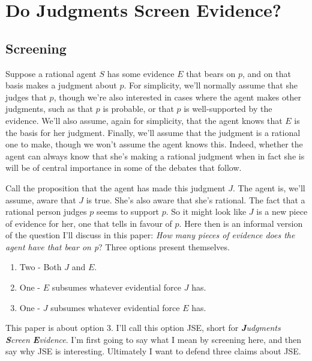 \chapter{Do Judgments Screen Evidence?}


\section{Screening}

\noindent Suppose a rational agent \(S\) has some evidence \(E\) that bears on \(p\), and on that basis makes a judgment about \(p\). For simplicity, we'll normally assume that she judges that \(p\), though we're also interested in cases where the agent makes other judgments, such as that \(p\) is probable, or that \(p\) is well-supported by the evidence. We'll also assume, again for simplicity, that the agent knows that \(E\) is the basis for her judgment. Finally, we'll assume that the judgment is a rational one to make, though we won't assume the agent knows this. Indeed, whether the agent can always know that she's making a rational judgment when in fact she is will be of central importance in some of the debates that follow.

Call the proposition that the agent has made this judgment \(J\). The agent is, we'll assume, aware that \(J\) is true. She's also aware that she's rational. The fact that a rational person judges \(p\) seems to support \(p\). So it might look like \(J\) is a new piece of evidence for her, one that tells in favour of \(p\). Here then is an informal version of the question I'll discuss in this paper: \textit{How many pieces of evidence does the agent have that bear on p}? Three options present themselves.

\begin{enumerate}
\item Two - Both \(J\) and \(E\).
\item One - \(E\) subsumes whatever evidential force \(J\) has.
\item One - \(J\) subsumes whatever evidential force \(E\) has.
\end{enumerate}

\noindent This paper is about option 3. I'll call this option JSE, short for \textit{\textbf{J}udgments \textbf{S}creen \textbf{E}vidence}. I'm first going to say what I mean by screening here, and then say why JSE is interesting. Ultimately I want to defend three claims about JSE.

